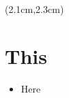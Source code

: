\begin{preview}
	\begin{textblock*}{5cm}(2.1cm,2.3cm) %
		{\color{red}{\large \textcircled{\small \themypage}}}
		\addtocounter{mypage}{1}
	\end{textblock*}
	
	\begin{minipage}{\textwidth}
		\setlength{\parskip}{0.4\baselineskip}
		
		\section{This}
		
		\begin{itemize}
			\item Here
		\end{itemize}
		
	\end{minipage}
\end{preview}

\begin{comment}
\begin{preview}
\begin{textblock*}{5cm}(2.1cm,2.3cm) %
	{\color{red}{\large \textcircled{\small \themypage}}}
	\addtocounter{mypage}{1}
\end{textblock*}

\begin{minipage}{\textwidth}
	\setlength{\parskip}{0.4\baselineskip}

\section{This}

\begin{itemize}
	\item Here
\end{itemize}

\end{minipage}
\end{preview}

\end{comment}


